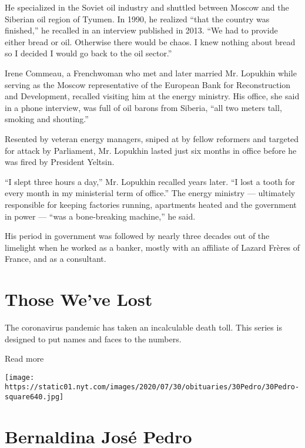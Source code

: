 He specialized in the Soviet oil industry and shuttled between Moscow
and the Siberian oil region of Tyumen. In 1990, he realized ``that the
country was finished,'' he recalled in an interview published in 2013.
``We had to provide either bread or oil. Otherwise there would be chaos.
I knew nothing about bread so I decided I would go back to the oil
sector.''

Irene Commeau, a Frenchwoman who met and later married Mr. Lopukhin
while serving as the Moscow representative of the European Bank for
Reconstruction and Development, recalled visiting him at the energy
ministry. His office, she said in a phone interview, was full of oil
barons from Siberia, ``all two meters tall, smoking and shouting.''

Resented by veteran energy managers, sniped at by fellow reformers and
targeted for attack by Parliament, Mr. Lopukhin lasted just six months
in office before he was fired by President Yeltsin.

``I slept three hours a day,'' Mr. Lopukhin recalled years later. ``I
lost a tooth for every month in my ministerial term of office.'' The
energy ministry --- ultimately responsible for keeping factories
running, apartments heated and the government in power --- ``was a
bone-breaking machine,'' he said.

His period in government was followed by nearly three decades out of the
limelight when he worked as a banker, mostly with an affiliate of Lazard
Frères of France, and as a consultant.

\href{https://www.nytimes.com/interactive/2020/obituaries/people-died-coronavirus-obituaries.html?action=click\&pgtype=Article\&state=default\&region=BELOW_MAIN_CONTENT\&context=covid_obits_promo}{}

\hypertarget{those-weve-lost}{%
\section{Those We've Lost}\label{those-weve-lost}}

The coronavirus pandemic has taken an incalculable death toll. This
series is designed to put names and faces to the numbers.

Read more

\texttt{[image: https://static01.nyt.com/images/2020/07/30/obituaries/30Pedro/30Pedro-square640.jpg]}

\hypertarget{bernaldina-josuxe9-pedro}{%
\section{Bernaldina José Pedro}\label{bernaldina-josuxe9-pedro}}

